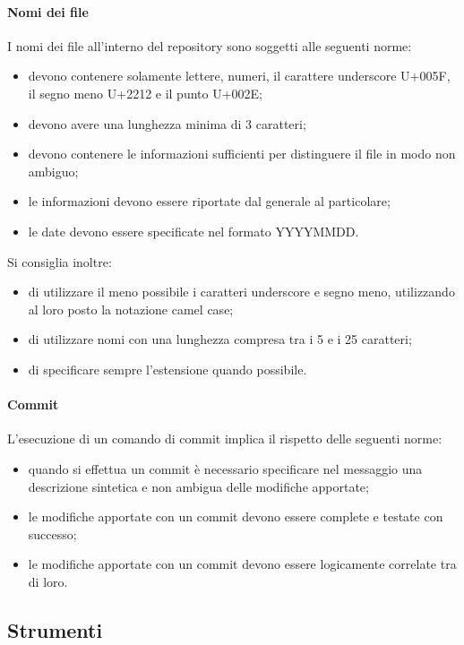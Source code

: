 			\paragraph{Nomi dei file}
				I nomi dei file all’interno del repository sono soggetti alle seguenti norme:
				\begin{itemize}
					\item devono contenere solamente lettere, numeri, il carattere underscore U+005F, il segno meno U+2212 e il punto U+002E;
					\item devono avere una lunghezza minima di 3 caratteri;
					\item devono contenere le informazioni sufficienti per distinguere il file in modo non ambiguo;
					\item le informazioni devono essere riportate dal generale al particolare;
					\item le date devono essere specificate nel formato YYYYMMDD.
				\end{itemize}
				Si consiglia inoltre:
				\begin{itemize}
					\item di utilizzare il meno possibile i caratteri underscore e segno meno, utilizzando al loro posto la notazione camel case;
					\item di utilizzare nomi con una lunghezza compresa tra i 5 e i 25 caratteri;
					\item di specificare sempre l’estensione quando possibile.
				\end{itemize}
			\paragraph{Commit}
				L'esecuzione di un comando di commit implica il rispetto delle seguenti norme:
				\begin{itemize}
					\item quando si effettua un commit è necessario specificare nel messaggio una descrizione sintetica e non ambigua delle modifiche apportate;
					\item le modifiche apportate con un commit devono essere complete e testate con successo;
					\item le modifiche apportate con un commit devono essere logicamente correlate tra di loro.
				\end{itemize}
	\subsection{Strumenti}
